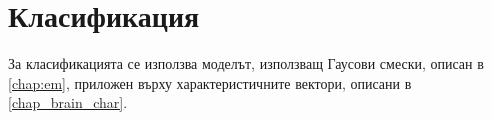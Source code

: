 \documentclass[main.tex]{subfiles}
\begin{document}
\section{Класификация}
За класификацията се използва моделът, използващ Гаусови смески, описан в \autoref{chap:em}, приложен върху характеристичните вектори, описани в \autoref{chap_brain_char}.
\end{document}
